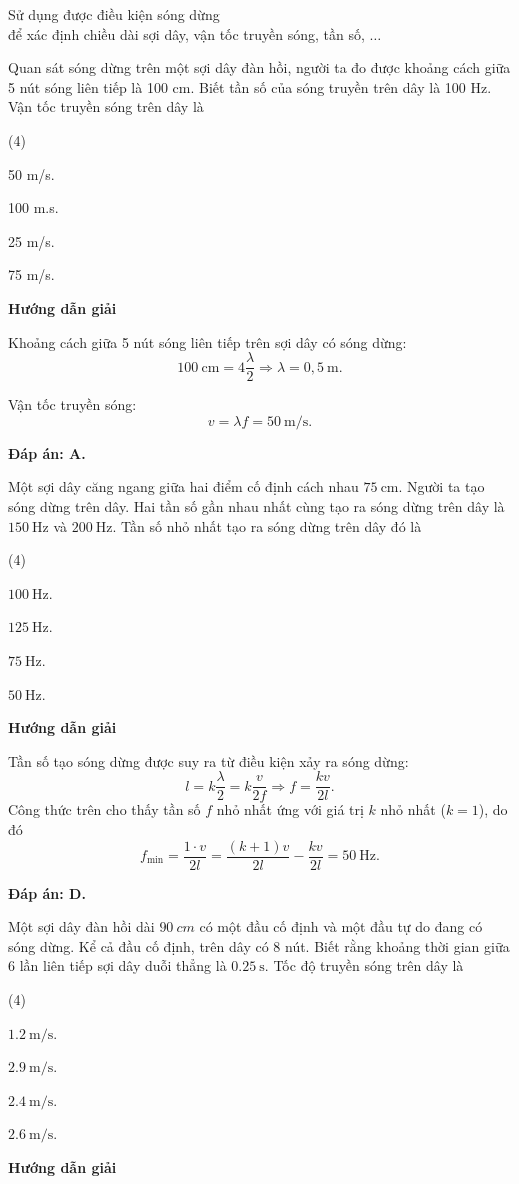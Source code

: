 \begin{dang}{Sử dụng được điều kiện sóng dừng\\ để xác định chiều dài sợi dây, vận tốc truyền sóng, tần số, $\ldots$}
	{Quan sát sóng dừng trên một sợi dây đàn hồi, người ta đo được khoảng cách giữa 5 nút sóng liên tiếp là 100 cm. Biết tần số của sóng truyền trên dây là 100 Hz. Vận tốc truyền sóng trên dây là
		\begin{mcq}(4)
			\item 50 m/s.
			\item 100 m.s. 
			\item 25 m/s.
			\item 75 m/s.
		\end{mcq}
	}
	{
		\begin{center}
			\textbf{Hướng dẫn giải}
		\end{center}
		
		Khoảng cách giữa 5 nút sóng liên tiếp trên sợi dây có sóng dừng:
		$$100\ \text{cm} = 4 \dfrac{\lambda}{2} \Rightarrow \lambda = 0,5\ \text{m}.$$
		
		Vận tốc truyền sóng:
		$$v=\lambda f = 50\ \text{m/s}.$$
		
		\textbf{Đáp án: A.}
	}
	{Một sợi dây căng ngang giữa hai điểm cố định cách nhau $75\ \text{cm}$. Người ta tạo sóng dừng trên dây. Hai tần số gần nhau nhất cùng tạo ra sóng dừng trên dây là $150\ \text{Hz}$ và $200\ \text{Hz}$. Tần số nhỏ nhất tạo ra sóng dừng trên dây đó là
		\begin{mcq}(4)
			\item $100\ \text{Hz}$.
			\item $125\ \text{Hz}$.
			\item $75\ \text{Hz}$.
			\item $50\ \text{Hz}$.
		\end{mcq}	
	}
	{\begin{center}
			\textbf{Hướng dẫn giải}
		\end{center}
		
		Tần số tạo sóng dừng được suy ra từ điều kiện xảy ra sóng dừng:
		$$l=k\dfrac{\lambda}{2}=k\dfrac{v}{2f}\Rightarrow f=\dfrac{kv}{2l}.$$
		Công thức trên cho thấy tần số $f$ nhỏ nhất ứng với giá trị $k$ nhỏ nhất ($k=1$), do đó 
		$$f_\text{min} = \dfrac{1\cdot v}{2l}=\dfrac{(k+1)v}{2l} - \dfrac{kv}{2l} = \SI{50}{\hertz}.$$
		
		\textbf{Đáp án: D.}	
	}
	{Một sợi dây đàn hồi dài $\SI{90}{cm}$ có một đầu cố định và một đầu tự do đang có sóng dừng. Kể cả đầu cố định, trên dây có 8 nút. Biết rằng khoảng thời gian giữa 6 lần liên tiếp sợi dây duỗi thẳng là $\SI{0.25}{\second}$. Tốc độ truyền sóng trên dây là
		\begin{mcq}(4)
			\item $\SI{1.2}{\meter/\second}$.
			\item $\SI{2.9}{\meter/\second}$.
			\item $\SI{2.4}{\meter/\second}$.
			\item $\SI{2.6}{\meter/\second}$.
		\end{mcq}
	}
	{
		\begin{center}
			\textbf{Hướng dẫn giải}
		\end{center}
		
}
\end{dang}
